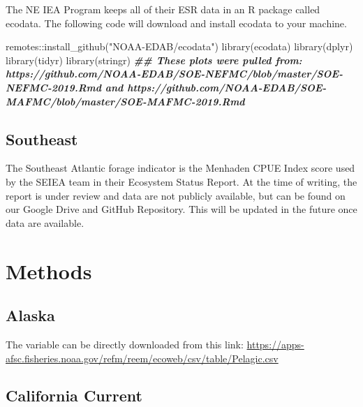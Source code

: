 \documentclass[
]{book}
\newenvironment{Shaded}{\begin{snugshade}}{\end{snugshade}}
\newcommand{\DocumentationTok}[1]{\textcolor[rgb]{0.56,0.35,0.01}{\textbf{\textit{#1}}}}
\newcommand{\FunctionTok}[1]{\textcolor[rgb]{0.00,0.00,0.00}{#1}}
\newcommand{\NormalTok}[1]{#1}
\newcommand{\SpecialCharTok}[1]{\textcolor[rgb]{0.00,0.00,0.00}{#1}}
\newcommand{\StringTok}[1]{\textcolor[rgb]{0.31,0.60,0.02}{#1}}
\begin{document}
The NE IEA Program keeps all of their ESR data in an R package called ecodata. The following code will download and install ecodata to your machine.

\begin{Shaded}
\begin{Highlighting}[]
\NormalTok{remotes}\SpecialCharTok{::}\FunctionTok{install\_github}\NormalTok{(}\StringTok{"NOAA{-}EDAB/ecodata"}\NormalTok{)}
\FunctionTok{library}\NormalTok{(ecodata)}
\FunctionTok{library}\NormalTok{(dplyr)}
\FunctionTok{library}\NormalTok{(tidyr)}
\FunctionTok{library}\NormalTok{(stringr)}
\DocumentationTok{\#\# These plots were pulled from: https://github.com/NOAA{-}EDAB/SOE{-}NEFMC/blob/master/SOE{-}NEFMC{-}2019.Rmd and https://github.com/NOAA{-}EDAB/SOE{-}MAFMC/blob/master/SOE{-}MAFMC{-}2019.Rmd}
\end{Highlighting}
\end{Shaded}

\hypertarget{southeast}{%
\subsection{Southeast}\label{southeast}}

The Southeast Atlantic forage indicator is the Menhaden CPUE Index score used by the SEIEA team in their Ecosystem Status Report. At the time of writing, the report is under review and data are not publicly available, but can be found on our Google Drive and GitHub Repository. This will be updated in the future once data are available.

\hypertarget{methods-2}{%
\section{Methods}\label{methods-2}}

\hypertarget{alaska-1}{%
\subsection{Alaska}\label{alaska-1}}

The variable can be directly downloaded from this link: \url{https://apps-afsc.fisheries.noaa.gov/refm/reem/ecoweb/csv/table/Pelagic.csv}

\hypertarget{california-current-1}{%
\subsection{California Current}\label{california-current-1}}
\end{document}
